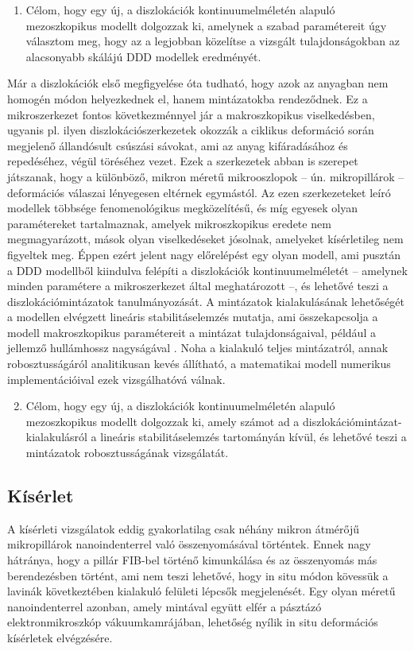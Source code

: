\begin{enumerate}
\setcounter{enumi}{0}
\item Célom, hogy egy új, a diszlokációk kontinuumelméletén alapuló mezoszkopikus modellt dolgozzak ki, amelynek a szabad paramétereit úgy választom meg, hogy az a legjobban közelítse a vizsgált tulajdonságokban az alacsonyabb skálájú DDD modellek eredményét.
\end{enumerate}

Már a diszlokációk első megfigyelése óta tudható, hogy azok az anyagban nem homogén módon helyezkednek el, hanem mintázatokba rendeződnek. Ez a mikroszerkezet fontos következménnyel jár a makroszkopikus viselkedésben, ugyanis pl. ilyen diszlokációszerkezetek okozzák a ciklikus deformáció során megjelenő állandósult csúszási sávokat, ami az anyag kifáradásához és repedéséhez, végül töréséhez vezet. Ezek a szerkezetek abban is szerepet játszanak, hogy a különböző, mikron méretű mikrooszlopok – ún. mikropillárok -- deformációs válaszai lényegesen eltérnek egymástól. Az ezen szerkezeteket leíró modellek többsége fenomenológikus megközelítésű, és míg egyesek olyan paramétereket tartalmaznak, amelyek mikroszkopikus eredete nem megmagyarázott, mások olyan viselkedéseket jósolnak, amelyeket kísérletileg nem figyeltek meg. Éppen ezért jelent nagy előrelépést egy olyan modell, ami pusztán a DDD modellből kiindulva felépíti a diszlokációk kontinuumelméletét -- amelynek minden paramétere a mikroszerkezet által meghatározott --, és lehetővé teszi a diszlokációmintázatok tanulmányozását. A mintázatok kialakulásának lehetőségét a modellen elvégzett lineáris stabilitáselemzés mutatja, ami összekapcsolja a modell makroszkopikus paramétereit a mintázat tulajdonságaival, például a jellemző hullámhossz nagyságával \cite{PhysRevB.93.214110}. Noha a kialakuló teljes mintázatról, annak robosztusságáról analitikusan kevés állítható, a matematikai modell numerikus implementációival ezek vizsgálhatóvá válnak.

\begin{enumerate}
\setcounter{enumi}{1}
\item Célom, hogy egy új, a diszlokációk kontinuumelméletén alapuló mezoszkopikus modellt dolgozzak ki, amely számot ad a diszlokációmintázat-kialakulásról a lineáris stabilitáselemzés tartományán kívül, és lehetővé teszi a mintázatok robosztusságának vizsgálatát.
\end{enumerate}

\subsection*{Kísérlet}
A kísérleti vizsgálatok eddig gyakorlatilag csak néhány mikron átmérőjű mikropillárok nanoindenterrel való összenyomásával történtek. Ennek nagy hátránya, hogy a pillár FIB-bel történő kimunkálása és az összenyomás más berendezésben történt, ami nem teszi lehetővé, hogy in situ módon kövessük a lavinák következtében kialakuló felületi lépcsők megjelenését. Egy olyan méretű nanoindenterrel azonban, amely mintával együtt elfér a pásztázó elektronmikroszkóp vákuumkamrájában, lehetőség nyílik in situ deformációs kísérletek elvégzésére.

